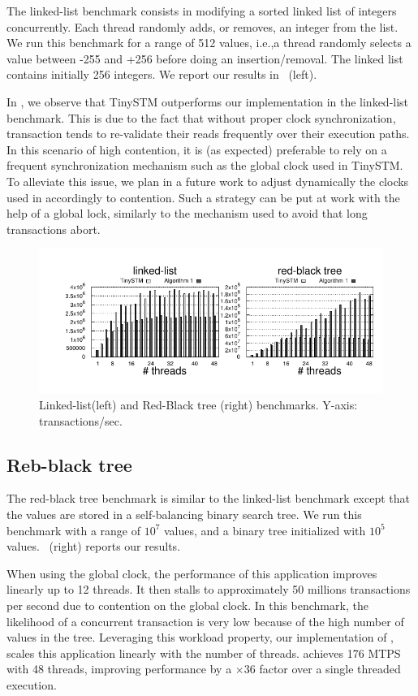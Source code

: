 The linked-list benchmark consists in modifying a sorted linked list of integers concurrently. 
Each thread randomly adds, or removes, an integer from the list. 
We run this benchmark for a range of 512 values, i.e.,a thread randomly selects a value between -255 and +256 before doing an insertion/removal.
The linked list contains initially 256 integers.
We report our results in ~(left).

In , we observe that TinySTM outperforms our implementation in the linked-list benchmark.
This is due to the fact that without proper clock synchronization, transaction tends to re-validate their reads frequently over their execution paths.
In this scenario of high contention, it is (as expected) preferable to rely on a frequent synchronization mechanism such as the global clock used in TinySTM.
To alleviate this issue, we plan in a future work to adjust dynamically the clocks used in  accordingly to contention.
Such a strategy can be put at work with the help of a global lock, similarly to the mechanism used to avoid that long transactions abort.

\begin{figure}[!t]
  \centering
  \includegraphics[scale = 1.0]{results/intset/ll-rb.pdf}
  \caption{Linked-list(left) and Red-Black tree (right) benchmarks. Y-axis: transactions/sec. }
\end{figure}

\subsection{Reb-black tree}

The red-black tree benchmark is similar to the linked-list benchmark except that the values are stored in a self-balancing binary search tree. 
We run this benchmark with a range of $10^7$ values, and a binary tree initialized with $10^5$ values.
~(right) reports our results.

When using the global clock, the performance of this application improves linearly up to 12 threads. 
It then stalls to approximately 50 millions transactions per second due to contention on the global clock.
In this benchmark, the likelihood of a concurrent transaction is very low because of the high number of values in the tree.
Leveraging this workload property, our implementation of , scales this application linearly with the number of threads.
 achieves 176 MTPS with 48 threads, improving performance by a $\times 36$ factor over a single threaded execution.


